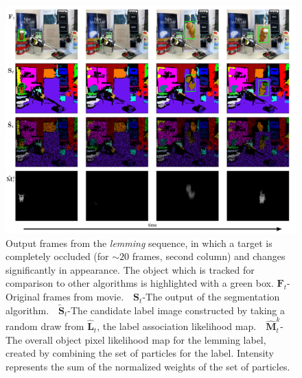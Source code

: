 
\begin{figure}[t]
\includegraphics[width=\linewidth]{figures/ECCV2012/Tracking.pdf}
  \caption[Tracked output from lemming sequence]{Output frames from the \textit{lemming} sequence, in which a target is completely occluded (for $\sim20$ frames, second column) and changes significantly in appearance. The object which is tracked for comparison to other algorithms is highlighted with a green box. $\mathbf{F}_t$-Original frames from  movie.~~$\mathbf{S}_t$-The output of the segmentation algorithm.~~$\tilde{\mathbf{S}}_{t}$-The candidate label image constructed by taking a random draw from $\mathbf{\hat{L}}_{t}$, the label association likelihood map.~~$\mathbf{\hat{M}}^k_{t}$-The overall object pixel likelihood map for the lemming label, created by combining the set of particles for the label. Intensity represents the sum of the normalized weights of the set of particles.}
\label{fig:Results}
\end{figure}


